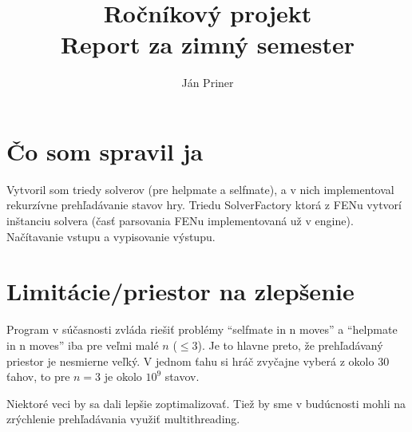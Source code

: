\documentclass[a4paper, 11pt]{article}
\title{
    Ročníkový projekt \\
    \large Report za zimný semester
}
\author{Ján Priner}
\date{}
\begin{document}
\maketitle

\section{Čo som spravil ja}

Vytvoril som triedy solverov (pre helpmate a selfmate), a v nich implementoval
rekurzívne prehľadávanie stavov hry. Triedu SolverFactory ktorá z FENu vytvorí
inštanciu solvera (časť parsovania FENu implementovaná už v engine).
Načítavanie vstupu a vypisovanie výstupu.

\section{Limitácie/priestor na zlepšenie}

Program v súčasnosti zvláda riešiť problémy \enquote{selfmate in n moves}
a \enquote{helpmate in n moves} iba pre veľmi malé $n$ ($\leq 3$). Je to hlavne
preto, že prehľadávaný priestor je nesmierne veľký. V jednom ťahu si hráč
zvyčajne vyberá z okolo 30 ťahov, to pre $n=3$ je okolo $10^9$ stavov.

Niektoré veci by sa dali lepšie zoptimalizovať. Tiež by sme v budúcnosti mohli
na zrýchlenie prehľadávania využiť multithreading.
\end{document}
